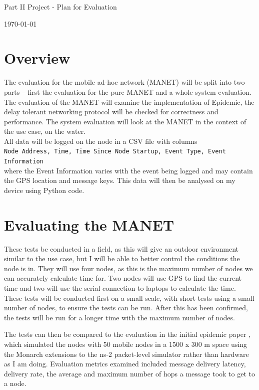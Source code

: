 \documentclass[10pt, a4paper]{article}
\begin{document}
\begin{center}
\Huge{Part II Project - Plan for Evaluation} \par
\Large{\today} \par
\end{center}
\par
\par

\section{Overview}
The evaluation for the mobile ad-hoc network (MANET) will be split into two parts -- first the evaluation for the pure MANET and a whole system evaluation. The evaluation of the MANET will examine the implementation of Epidemic, the delay tolerant networking protocol will be checked for correctness and performance. The system evaluation will look at the MANET in the context of the use case, on the water.  \\

All data will be logged on the node in a CSV file with columns \\ \verb'Node Address, Time, Time Since Node Startup, Event Type, Event Information' \\ where the Event Information varies with the event being logged and may contain the GPS location and message keys. This data will then be analysed on my device using Python code.

\section{Evaluating the MANET}
These tests be conducted in a field, as this will give an outdoor environment similar to the use case, but I will be able to better control the conditions the node is in. They will use four nodes, as this is the maximum number of nodes we can accurately calculate time for. Two nodes will use GPS to find the current time and two will use the serial connection to laptops to calculate the time. These tests will be conducted first on a small scale, with short tests using a small number of nodes, to ensure the tests can be run. After this has been confirmed, the tests will be run for a longer time with the maximum number of nodes. 

The tests can then be compared to the evaluation in the initial epidemic paper \cite{epidemic}, which simulated the nodes with 50 mobile nodes in a 1500 x 300 m space using the Monarch extensions to the ns-2 packet-level simulator rather than hardware as I am doing. Evaluation metrics examined included message delivery latency, delivery rate, the average and maximum number of hops a message took to get to a node.
\end{document}
